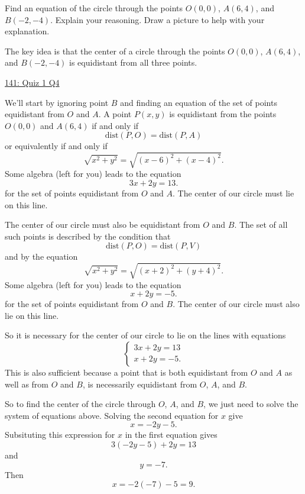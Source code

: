 \documentclass{ximera}
\begin{document}
\begin{question} \label{Qsdfl4345r3}
Find an equation of the circle through the points $O(0,0)$, $A(6,4)$, and $B(-2,-4)$. Explain your reasoning. Draw a picture to help with your explanation.

\begin{explanation}
The key idea is that the center of a circle through the points $O(0,0)$, $A(6,4)$, and $B(-2,-4)$ is equidistant from all three points. 

\begin{onlineOnly}
    \begin{center}
\end{center}
\end{onlineOnly}

\href{https://www.desmos.com/calculator/uqzhkgp2ju}{141: Quiz 1 Q4}

We'll start by ignoring point $B$ and finding an equation of the set of points equidistant from $O$ and $A$. A point $P(x,y)$ is equidistant from the points $O(0,0)$ and $A(6,4)$ if and only if
\[
       \text{dist}(P,O) = \text{dist}(P,A) 
\]
or equivalently if and only if 
\[
   \sqrt{x^2+y^2} = \sqrt{(x-6)^2 + (x-4)^2}  .
\]
Some algebra (left for you) leads to the equation
\[
       3x + 2y = 13 .
\]
for the set of points equidistant from $O$ and $A$. The center of our circle must lie on this line.

The center of our circle must also be equidistant from $O$ and $B$. The set of all such points is described by the condition that
\[
   \text{dist}(P,O) = \text{dist}(P,V) 
\]
and by the equation
\[
   \sqrt{x^2+y^2} = \sqrt{(x+2)^2 + (y+4)^2}  .
\]
Some algebra (left for you) leads to the equation
\[
       x+2y = -5 .
\]
for the set of points equidistant from $O$ and $B$. The center of our circle must also lie on this line.

So it is necessary for the center of our circle to lie on the lines with equations
\[
 \begin{cases}
             3x  + 2y = 13 \\
             x+2y = -5   .
\end{cases}
\]
This is also sufficient because a point that is both equidistant from $O$ and $A$ as well as from $O$ and $B$, is necessarily equidistant from $O$, $A$, and $B$. 

So to find the center of the circle through $O$, $A$, and $B$, we just need to solve the system of equations above. Solving the second equation for $x$ give
\[
     x = -2y - 5.
\]
Subsituting this expression for $x$ in the first equation gives
\[
   3 (-2y-5) + 2y = 13 
\]
and 
\[
          y= -7 .
\]
Then 
\[
   x = -2(-7) - 5  = 9 .
\]


\end{explanation}
\end{question}
\end{document}
